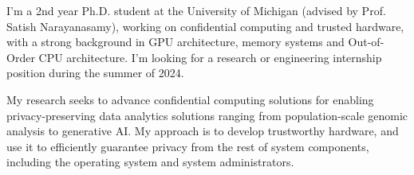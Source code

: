 I'm a 2nd year Ph.D. student at the University of Michigan (advised by Prof. Satish Narayanasamy), working on confidential computing and trusted hardware, with a strong background in GPU architecture, memory systems and Out-of-Order CPU architecture. I'm looking for a research or engineering internship position during the summer of 2024. \par
My research seeks to advance confidential computing solutions for enabling privacy-preserving data analytics solutions ranging from population-scale genomic analysis to generative AI.  My approach is to develop trustworthy hardware, and use it to efficiently guarantee privacy from the rest of system components, including the operating system and system administrators. \par

\vspace{3ex}





